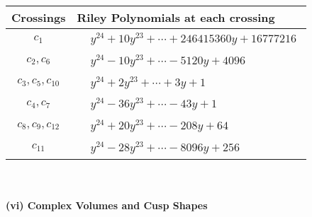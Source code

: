 \documentclass[1p]{elsarticle_modified}
\theoremstyle{definition}
\begin{document}
\begin{tabular}{m{50pt}|m{274pt}}
Crossings & \hspace{64pt}Riley Polynomials at each crossing \\
\hline $$\begin{aligned}c_{1}\end{aligned}$$&$\begin{aligned}
&y^{24}+10 y^{23}+\cdots+246415360 y+16777216
\end{aligned}$\\
\hline $$\begin{aligned}c_{2},c_{6}\end{aligned}$$&$\begin{aligned}
&y^{24}-10 y^{23}+\cdots-5120 y+4096
\end{aligned}$\\
\hline $$\begin{aligned}c_{3},c_{5},c_{10}\end{aligned}$$&$\begin{aligned}
&y^{24}+2 y^{23}+\cdots+3 y+1
\end{aligned}$\\
\hline $$\begin{aligned}c_{4},c_{7}\end{aligned}$$&$\begin{aligned}
&y^{24}-36 y^{23}+\cdots-43 y+1
\end{aligned}$\\
\hline $$\begin{aligned}c_{8},c_{9},c_{12}\end{aligned}$$&$\begin{aligned}
&y^{24}+20 y^{23}+\cdots-208 y+64
\end{aligned}$\\
\hline $$\begin{aligned}c_{11}\end{aligned}$$&$\begin{aligned}
&y^{24}-28 y^{23}+\cdots-8096 y+256
\end{aligned}$\\
\hline
\end{tabular}\\~\\
\newpage\flushleft \textbf{(vi) Complex Volumes and Cusp Shapes}
\end{document}
